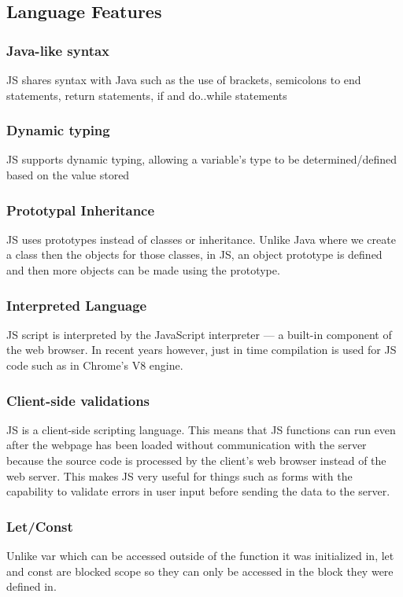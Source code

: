 \documentclass{article}
\begin{document}
  \subsection{Language Features}

  \subsubsection{Java-like syntax}
  JS shares syntax with Java such as the use of brackets, semicolons to end
  statements, return statements, if and do..while statements

  \subsubsection{Dynamic typing}
  JS supports dynamic typing, allowing a variable’s type to be
  determined/defined based on the value stored

  \subsubsection{Prototypal Inheritance}
  JS uses prototypes instead of classes or inheritance. Unlike Java where we
  create a class then the objects for those classes, in JS, an object prototype
  is defined and then more objects can be made using the prototype.

  \subsubsection{Interpreted Language}
  JS script is interpreted by the JavaScript interpreter --- a built-in
  component of the web browser. In recent years however, just in time
  compilation is used for JS code such as in Chrome’s V8 engine.

  \subsubsection{Client-side validations}
  JS is a client-side scripting language. This means that JS functions can run
  even after the webpage has been loaded without communication with the server
  because the source code is processed by the client’s web browser instead of
  the web server. This makes JS very useful for things such as forms with the
  capability to validate errors in user input before sending the data to the
  server.

  \subsubsection{Let/Const}
  Unlike var which can be accessed outside of the function it was initialized
  in, let and const are blocked scope so they can only be accessed in the block
  they were defined in.
\end{document}
